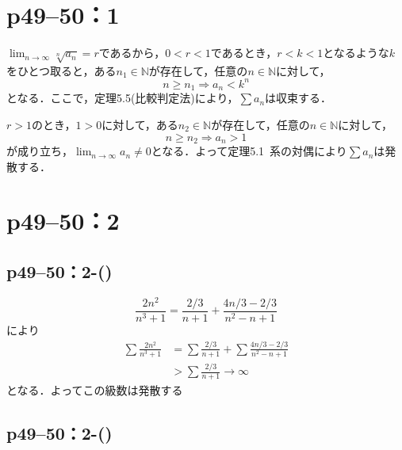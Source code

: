 \section*{p49--50：1}

\begin{tproof}
    $\lim_{n \to \infty} \sqrt[n]{a_n} =r$であるから，$0<r<1$であるとき，$r<k<1$となるような$k$をひとつ取ると，ある$n_1 \in \mathbb{N}$が存在して，任意の$n \in \mathbb{N}$に対して，
    \[
        n \ge n_1 \Longrightarrow a_n<k^n
    \]
    となる．ここで，定理5.5(比較判定法)により，$\sum a_n$は収束する．

    $r>1$のとき，$1>0$に対して，ある$n_2 \in \mathbb{N}$が存在して，任意の$n \in \mathbb{N}$に対して，
    \[
        n \ge n_2 \Longrightarrow a_n >1
    \]
    が成り立ち，$\lim_{n \to \infty} a_n \ne 0$となる．よって定理5.1~系の対偶により$\sum a_n$は発散する．
\end{tproof}


\section*{p49--50：2}


\subsection*{p49--50：2-()}

\begin{tanswer}
    \[
        \frac{2n^2}{n^3+1}=\frac{2/3}{n+1}+\frac{4n/3-2/3}{n^2-n+1}
    \]
    により
    \begin{align*}
        \sum \frac{2n^2}{n^3+1} & =\sum \frac{2/3}{n+1}+\sum \frac{4n/3-2/3}{n^2-n+1} \\
                                & >\sum \frac{2/3}{n+1} \rightarrow \infty
    \end{align*}
    となる．よってこの級数は発散する
\end{tanswer}


\subsection*{p49--50：2-()}

